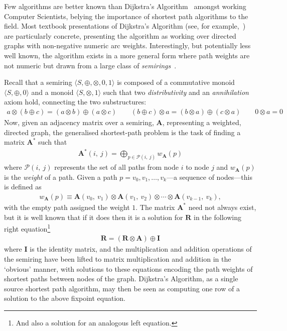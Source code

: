 Few algorithms are better known than Dijkstra's Algorithm~\cite{dijkstra:note:1959} amongst working Computer Scientists, belying the importance of shortest path algorithms to the field.
Most textbook presentations of Dijkstra's Algorithm (see, for example,~\cite[Chapter 24]{clrs}) are particularly concrete, presenting the algorithm as working over directed graphs with non-negative numeric arc weights.
Interestingly, but potentially less well known, the algorithm exists in a more general form where path weights are not numeric but drawn from a large class of \emph{semirings}~\cite{gondran_graphs_2008, mohri:semiring:2002}.

Recall that a semiring $\langle S, \oplus, \otimes, 0, 1 \rangle$ is composed of a commutative monoid $\langle S, \oplus, 0\rangle$ and a monoid $\langle S, \otimes, 1\rangle$ such that two \emph{distributivity} and an \emph{annihilation} axiom hold, connecting the two substructures:
\begin{gather*}
a\otimes (b \oplus c) = (a\otimes b) \oplus (a\otimes c) \qquad
(b \oplus c) \otimes a = (b\otimes a) \oplus (c\otimes a) \qquad
0 \otimes a = 0
\end{gather*}
Now, given an adjacency matrix over a semiring, $\mathbf{A}$, representing a weighted, directed graph, the generalised shortest-path problem is the task of finding a matrix $\mathbf{A}^*$ such that
\begin{gather*}
\label{eq:global}
\mathbf{A}^*(i,\ j) = \displaystyle\bigoplus_{p \in \mathcal{P}(i,\ j)} w_{\mathbf{A}}(p)
\end{gather*}
where $\mathcal{P}(i,\ j)$ represents the set of all paths from node $i$ to node $j$ and $w_{\mathbf{A}}(p)$ is the \emph{weight} of a path.
Given a path $p = v_0, v_1, \ldots, v_k$---a sequence of nodes---this is defined as
\begin{gather*}
    w_{\mathbf{A}}(p)
    \equiv
    \mathbf{A}(v_0,\ v_1)
    \otimes \mathbf{A}(v_1,\ v_2)
    \otimes \cdots
    \otimes \mathbf{A}(v_{k-1},\ v_k),
\end{gather*}
with the empty path assigned the weight $1$.
The matrix $\mathbf{A}^*$ need not always exist, but it is well known that if it does then it is a solution for $\mathbf{R}$ in the following right equation\footnote{And also a solution for an analogous left equation.}
\begin{gather*}
\mathbf{R} = (\mathbf{R} \otimes \mathbf{A}) \oplus \mathbf{I}
\end{gather*}
where $\mathbf{I}$ is the identity matrix, and the multiplication and addition operations of the semiring have been lifted to matrix multiplication and addition in the `obvious' manner, with solutions to these equations encoding the path weights of shortest paths between nodes of the graph.
Dijkstra's Algorithm, as a single source shortest path algorithm, may then be seen as computing one row of a solution to the above fixpoint equation.

